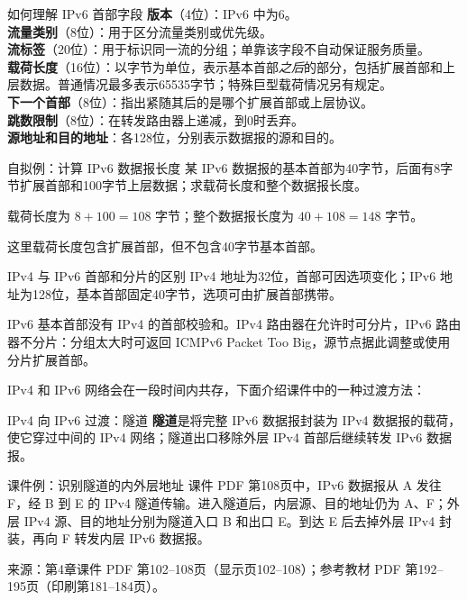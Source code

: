 \begin{proposition}{如何理解 IPv6 首部字段}
\textbf{版本}（4位）：IPv6 中为6。\\
\textbf{流量类别}（8位）：用于区分流量类别或优先级。\\
\textbf{流标签}（20位）：用于标识同一流的分组；单靠该字段不自动保证服务质量。\\
\textbf{载荷长度}（16位）：以字节为单位，表示基本首部\emph{之后}的部分，包括扩展首部和上层数据。普通情况最多表示65535字节；特殊巨型载荷情况另有规定。\\
\textbf{下一个首部}（8位）：指出紧随其后的是哪个扩展首部或上层协议。\\
\textbf{跳数限制}（8位）：在转发路由器上递减，到0时丢弃。\\
\textbf{源地址和目的地址}：各128位，分别表示数据报的源和目的。
\end{proposition}

\begin{example}{自拟例：计算 IPv6 数据报长度}
某 IPv6 数据报的基本首部为40字节，后面有8字节扩展首部和100字节上层数据；求载荷长度和整个数据报长度。
\end{example}
\begin{solution}
载荷长度为 $8+100=108$ 字节；整个数据报长度为 $40+108=148$ 字节。
\end{solution}
\begin{remark}
这里载荷长度包含扩展首部，但不包含40字节基本首部。
\end{remark}

\begin{proposition}{IPv4 与 IPv6 首部和分片的区别}
IPv4 地址为32位，首部可因选项变化；IPv6 地址为128位，基本首部固定40字节，选项可由扩展首部携带。

IPv6 基本首部没有 IPv4 的首部校验和。IPv4 路由器在允许时可分片，IPv6 路由器不分片：分组太大时可返回 ICMPv6 Packet Too Big，源节点据此调整或使用分片扩展首部。
\end{proposition}

IPv4 和 IPv6 网络会在一段时间内共存，下面介绍课件中的一种过渡方法：

\begin{definition}{IPv4 向 IPv6 过渡：隧道}
\textbf{隧道}是将完整 IPv6 数据报封装为 IPv4 数据报的载荷，使它穿过中间的 IPv4 网络；隧道出口移除外层 IPv4 首部后继续转发 IPv6 数据报。
\end{definition}

\begin{example}{课件例：识别隧道的内外层地址}
课件 PDF 第108页中，IPv6 数据报从 A 发往 F，经 B 到 E 的 IPv4 隧道传输。进入隧道后，内层源、目的地址仍为 A、F；外层 IPv4 源、目的地址分别为隧道入口 B 和出口 E。到达 E 后去掉外层 IPv4 封装，再向 F 转发内层 IPv6 数据报。
\end{example}
\par\small\noindent 来源：第4章课件 PDF 第102--108页（显示页102--108）；参考教材 PDF 第192--195页（印刷第181--184页）。\normalsize

